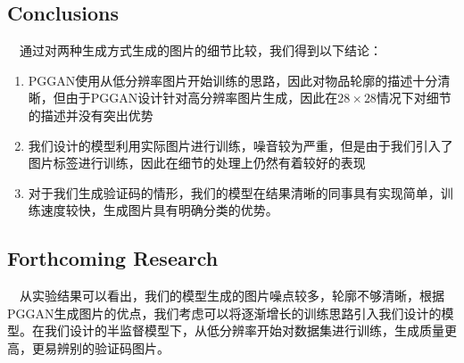 \documentclass[portrait]{a0poster}
\begin{document}
\begin{multicols}{2}
\begin{CJK}{UTF8}{gbsn}
\color{SaddleBrown}
\section*{Conclusions}

\ \ 通过对两种生成方式生成的图片的细节比较，我们得到以下结论：
\begin{enumerate}
	\item PGGAN\supercite{DBLP:journals/corr/abs-1710-10196}使用从低分辨率图片开始训练的思路，因此对物品轮廓的描述十分清晰，但由于PGGAN设计针对高分辨率图片生成，因此在$28 \times 28$情况下对细节的描述并没有突出优势
	\item 我们设计的模型利用实际图片进行训练，噪音较为严重，但是由于我们引入了图片标签进行训练，因此在细节的处理上仍然有着较好的表现
	\item 对于我们生成验证码的情形，我们的模型在结果清晰的同事具有实现简单，训练速度较快，生成图片具有明确分类的优势。
\end{enumerate}



\end{CJK}

\color{DarkSlateGray} %

\begin{CJK}{UTF8}{gbsn}
\section*{Forthcoming Research}

\ \ 从实验结果可以看出，我们的模型生成的图片噪点较多，轮廓不够清晰，根据PGGAN生成图片的优点，我们考虑可以将逐渐增长的训练思路引入我们设计的模型。在我们设计的半监督模型下，从低分辨率开始对数据集进行训练，生成质量更高，更易辨别的验证码图片。

\end{CJK}
\printbibliography[title={References}]



\end{multicols}
\end{document}

